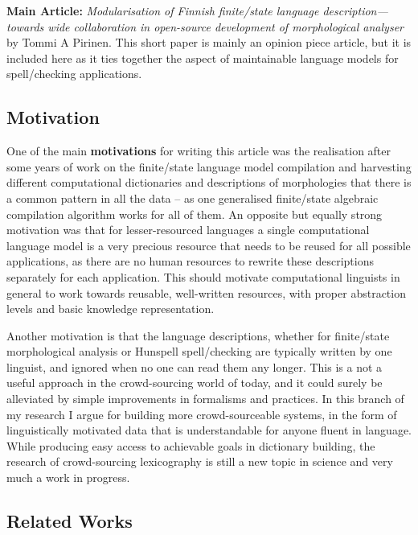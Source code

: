 \documentclass[officiallayout,final]{unihelcompling}
\begin{document}
\textbf{Main Article:} \emph{Modularisation of Finnish finite\-/state language
description—towards wide collaboration in open-source development of
morphological analyser} by Tommi A Pirinen. This short paper is mainly an
opinion piece article, but it is included here as it ties together the
aspect of maintainable language models for spell\-/checking applications.

\subsection{Motivation}

One of the main \textbf{motivations} for writing this article was the
realisation after some years of work on the finite\-/state language model
compilation and harvesting different computational dictionaries and
descriptions of morphologies that there is a common pattern in all the
data -- as one generalised finite\-/state algebraic compilation algorithm works
for all of them. An opposite but equally strong motivation was that for
lesser-resourced languages a single computational language model is a very
precious resource that needs to be reused for all possible applications, as
there are no human resources to rewrite these descriptions separately for each
application. This should motivate computational linguists in general to work
towards reusable, well-written resources, with proper abstraction levels and
basic knowledge representation.

Another motivation is that the language descriptions, whether for
finite\-/state morphological analysis or Hunspell spell\-/checking are
typically written by one linguist, and ignored when no one can read them any
longer.  This is a not a useful approach in the crowd-sourcing world of today,
and it could surely be alleviated by simple improvements in formalisms and
practices.  In this branch of my research I argue for building more
crowd-sourceable systems, in the form of linguistically motivated data that is
understandable for anyone fluent in language. While producing easy access to
achievable goals in dictionary building, the research of crowd-sourcing
lexicography is still a new topic in science and very much a work in progress.

\subsection{Related Works}
\end{document}
